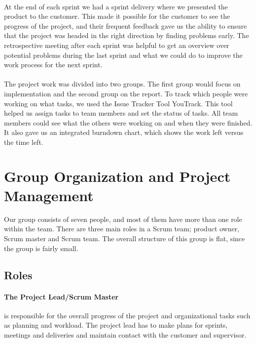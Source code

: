 \paragraph{} At the end of each sprint we had a sprint delivery where we presented the product to the customer. This made it possible for the customer to see the progress of the project, and their frequent feedback gave us the ability to ensure that the project was headed in the right direction by finding problems early. The retrospective meeting after each sprint was helpful to get an overview over potential problems during the last sprint and what we could do to improve the work process for the next sprint. 

\paragraph{} The project work was divided into two groups. The first group would focus on implementation and the second group on the report. To track which people were working on what tasks, we used the Issue Tracker Tool YouTrack. This tool helped us assign tasks to team members and set the status of tasks. All team members could see what the others were working on and when they were finished. It also gave us an integrated burndown chart, which shows the work left versus the time left.


\section{Group Organization and Project Management}
\label{sec:PlanningGroupOrg}
Our group consists of seven people, and most of them have more than one role within the team. There are three main roles in a Scrum team; product owner, Scrum master and Scrum team. The overall structure of this group is flat, since the group is fairly small.

\subsection{Roles}
\label{subsec:PlanningGroupOrgRoles}
\paragraph{The Project Lead/Scrum Master} is responsible for the overall progress of the project and organizational tasks such as planning and workload. The project lead has to make plans for sprints, meetings and deliveries and maintain contact with the customer and supervisor.

